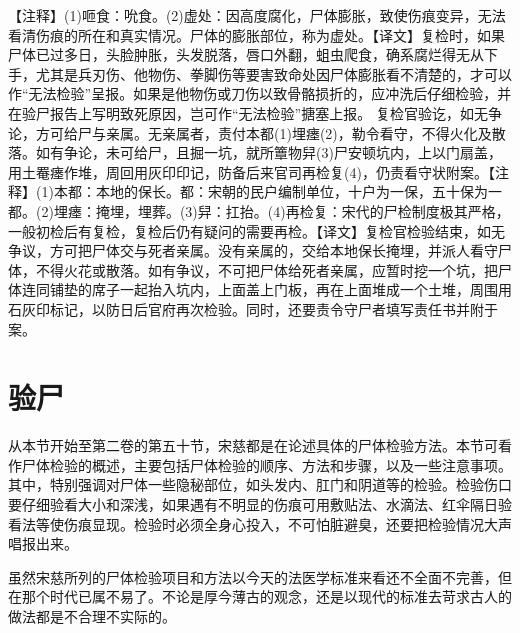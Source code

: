 \documentclass[12pt,UTF8]{ctexbook}
\begin{document}
【注释】(1)咂食：吮食。(2)虚处：因高度腐化，尸体膨胀，致使伤痕变异，无法看清伤痕的所在和真实情况。尸体的膨胀部位，称为虚处。【译文】复检时，如果尸体已过多日，头脸肿胀，头发脱落，唇口外翻，蛆虫爬食，确系腐烂得无从下手，尤其是兵刃伤、他物伤、拳脚伤等要害致命处因尸体膨胀看不清楚的，才可以作“无法检验”呈报。如果是他物伤或刀伤以致骨骼损折的，应冲洗后仔细检验，并在验尸报告上写明致死原因，岂可作“无法检验”搪塞上报。
复检官验讫，如无争论，方可给尸与亲属。无亲属者，责付本都(1)埋瘗(2)，勒令看守，不得火化及散落。如有争论，未可给尸，且掘一坑，就所簟物舁(3)尸安顿坑内，上以门扇盖，用土罨瘗作堆，周回用灰印印记，防备后来官司再检复(4)，仍责看守状附案。【注释】(1)本都：本地的保长。都：宋朝的民户编制单位，十户为一保，五十保为一都。(2)埋瘗：掩埋，埋葬。(3)舁：扛抬。(4)再检复：宋代的尸检制度极其严格，一般初检后有复检，复检后仍有疑问的需要再检。【译文】复检官检验结束，如无争议，方可把尸体交与死者亲属。没有亲属的，交给本地保长掩埋，并派人看守尸体，不得火花或散落。如有争议，不可把尸体给死者亲属，应暂时挖一个坑，把尸体连同铺垫的席子一起抬入坑内，上面盖上门板，再在上面堆成一个土堆，周围用石灰印标记，以防日后官府再次检验。同时，还要责令守尸者填写责任书并附于案。

\chapter{验尸}

从本节开始至第二卷的第五十节，宋慈都是在论述具体的尸体检验方法。本节可看作尸体检验的概述，主要包括尸体检验的顺序、方法和步骤，以及一些注意事项。其中，特别强调对尸体一些隐秘部位，如头发内、肛门和阴道等的检验。检验伤口要仔细验看大小和深浅，如果遇有不明显的伤痕可用敷贴法、水滴法、红伞隔日验看法等使伤痕显现。检验时必须全身心投入，不可怕脏避臭，还要把检验情况大声唱报出来。

虽然宋慈所列的尸体检验项目和方法以今天的法医学标准来看还不全面不完善，但在那个时代已属不易了。不论是厚今薄古的观念，还是以现代的标准去苛求古人的做法都是不合理不实际的。
\end{document}
